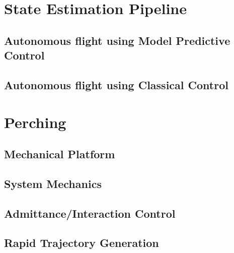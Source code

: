 \section{State Estimation Pipeline}
\subsection{Autonomous flight using Model Predictive Control}
\subsection{Autonomous flight using Classical Control}
\section{Perching}
\subsection{Mechanical Platform}
\subsection{System Mechanics}
\subsection{Admittance/Interaction Control}
\subsection{Rapid Trajectory Generation}


